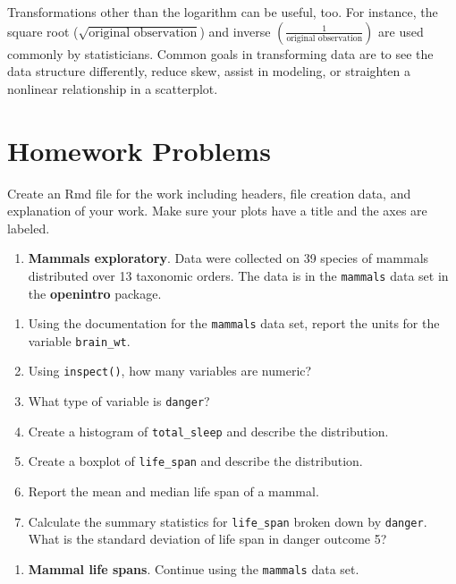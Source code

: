 \documentclass[
  letterpaper,
  DIV=11,
  numbers=noendperiod]{scrreprt}
\providecommand{\tightlist}{%
  \setlength{\itemsep}{0pt}\setlength{\parskip}{0pt}}\usepackage{longtable,booktabs,array}
\begin{document}
Transformations other than the logarithm can be useful, too. For
instance, the square root (\(\sqrt{\text{original observation}}\)) and
inverse \(\left(\frac{1}{\text{original observation}}\right)\) are used
commonly by statisticians. Common goals in transforming data are to see
the data structure differently, reduce skew, assist in modeling, or
straighten a nonlinear relationship in a scatterplot.

\section{Homework Problems}\label{homework-problems-4}

Create an Rmd file for the work including headers, file creation data,
and explanation of your work. Make sure your plots have a title and the
axes are labeled.

\begin{enumerate}
\def\labelenumi{\arabic{enumi}.}
\tightlist
\item
  \textbf{Mammals exploratory}. Data were collected on 39 species of
  mammals distributed over 13 taxonomic orders. The data is in the
  \texttt{mammals} data set in the \textbf{openintro} package.
\end{enumerate}

\begin{enumerate}
\def\labelenumi{\alph{enumi}.}
\item
  Using the documentation for the \texttt{mammals} data set, report the
  units for the variable \texttt{brain\_wt}.
\item
  Using \texttt{inspect()}, how many variables are numeric?
\item
  What type of variable is \texttt{danger}?
\item
  Create a histogram of \texttt{total\_sleep} and describe the
  distribution.
\item
  Create a boxplot of \texttt{life\_span} and describe the distribution.
\item
  Report the mean and median life span of a mammal.
\item
  Calculate the summary statistics for \texttt{life\_span} broken down
  by \texttt{danger}. What is the standard deviation of life span in
  danger outcome 5?
\end{enumerate}

\begin{enumerate}
\def\labelenumi{\arabic{enumi}.}
\setcounter{enumi}{1}
\tightlist
\item
  \textbf{Mammal life spans}. Continue using the \texttt{mammals} data
  set.
\end{enumerate}
\end{document}
